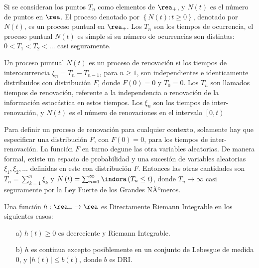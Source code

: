 Si se consideran los puntos $T_{n}$ como elementos de $\rea_{+}$, y $N\left(t\right)$ es el n\'umero de puntos en $\rea$. El proceso denotado por $\left\{N\left(t\right):t\geq0\right\}$, denotado por $N\left(t\right)$, es un proceso puntual en $\rea_{+}$. Los $T_{n}$ son los tiempos de ocurrencia, el proceso puntual $N\left(t\right)$ es simple si su n\'umero de ocurrencias son distintas: $0<T_{1}<T_{2}<\ldots$ casi seguramente.

\begin{Def}
Un proceso puntual $N\left(t\right)$ es un proceso de renovaci\'on si los tiempos de interocurrencia $\xi_{n}=T_{n}-T_{n-1}$, para $n\geq1$, son independientes e identicamente distribuidos con distribuci\'on $F$, donde $F\left(0\right)=0$ y $T_{0}=0$. Los $T_{n}$ son llamados tiempos de renovaci\'on, referente a la independencia o renovaci\'on de la informaci\'on estoc\'astica en estos tiempos. Los $\xi_{n}$ son los tiempos de inter-renovaci\'on, y $N\left(t\right)$ es el n\'umero de renovaciones en el intervalo $\left[0,t\right)$
\end{Def}


\begin{Note}
Para definir un proceso de renovaci\'on para cualquier contexto, solamente hay que especificar una distribuci\'on $F$, con $F\left(0\right)=0$, para los tiempos de inter-renovaci\'on. La funci\'on $F$ en turno degune las otra variables aleatorias. De manera formal, existe un espacio de probabilidad y una sucesi\'on de variables aleatorias $\xi_{1},\xi_{2},\ldots$ definidas en este con distribuci\'on $F$. Entonces las otras cantidades son $T_{n}=\sum_{k=1}^{n}\xi_{k}$ y $N\left(t\right)=\sum_{n=1}^{\infty}\indora\left(T_{n}\leq t\right)$, donde $T_{n}\rightarrow\infty$ casi seguramente por la Ley Fuerte de los Grandes NÃºmeros.
\end{Note}

%
%

\begin{Note} Una funci\'on $h:\rea_{+}\rightarrow\rea$ es Directamente Riemann Integrable en los siguientes casos:
\begin{itemize}
\item[a)] $h\left(t\right)\geq0$ es decreciente y Riemann Integrable.
\item[b)] $h$ es continua excepto posiblemente en un conjunto de Lebesgue de medida 0, y $|h\left(t\right)|\leq b\left(t\right)$, donde $b$ es DRI.
\end{itemize}
\end{Note}

